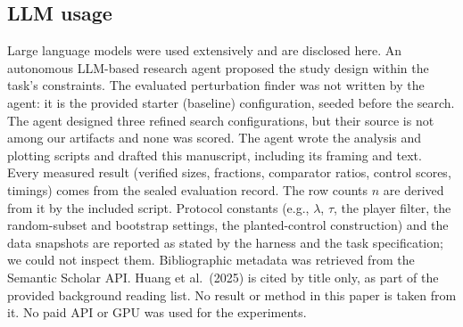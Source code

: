 \documentclass{article}
\begin{document}
\subsection{LLM usage}
\label{app:llm}

Large language models were used extensively and are disclosed here. An autonomous LLM-based research agent proposed the study design within the task's constraints. The evaluated perturbation finder was not written by the agent: it is the provided starter (baseline) configuration, seeded before the search. The agent designed three refined search configurations, but their source is not among our artifacts and none was scored. The agent wrote the analysis and plotting scripts and drafted this manuscript, including its framing and text. Every measured result (verified sizes, fractions, comparator ratios, control scores, timings) comes from the sealed evaluation record. The row counts $n$ are derived from it by the included script. Protocol constants (e.g., $\lambda$, $\tau$, the player filter, the random-subset and bootstrap settings, the planted-control construction) and the data snapshots are reported as stated by the harness and the task specification; we could not inspect them. Bibliographic metadata was retrieved from the Semantic Scholar API. Huang et al.~(2025) is cited by title only, as part of the provided background reading list. No result or method in this paper is taken from it. No paid API or GPU was used for the experiments.
\end{document}
